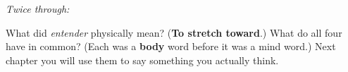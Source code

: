 \emph{Twice through:}

\begin{tcolorbox}[breakable,colback=teal!4,colframe=teal!35!black,title={Before you move on}]
What did \emph{entender} physically mean? (\textbf{To stretch toward}.) What do all four have in common? (Each was a \textbf{body} word before it was a mind word.) Next chapter you will use them to say something you actually think.
\end{tcolorbox}
